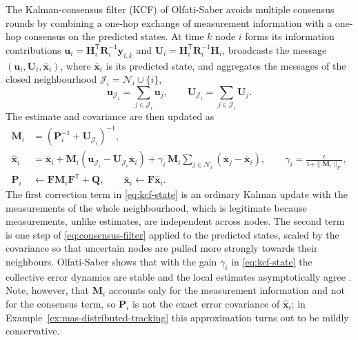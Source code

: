 The Kalman-consensus filter (KCF) of Olfati-Saber \cite{olfatisaber2007_dkf} avoids multiple consensus rounds by combining a one-hop exchange of measurement information with a one-hop consensus on the predicted states. At time $k$ node $i$ forms its information contributions $\mathbf{u}_i=\mathbf{H}_i^{\mathsf T}\mathbf{R}_i^{-1}\mathbf{y}_{i,k}$ and $\mathbf{U}_i=\mathbf{H}_i^{\mathsf T}\mathbf{R}_i^{-1}\mathbf{H}_i$, broadcasts the message $(\mathbf{u}_i,\mathbf{U}_i,\bar{\mathbf{x}}_i)$, where $\bar{\mathbf{x}}_i$ is its predicted state, and aggregates the messages of the closed neighbourhood $\mathcal{J}_i=\mathcal{N}_i\cup\{i\}$,
\begin{equation}
\mathbf{u}_{\mathcal{J}_i}=\sum_{j\in\mathcal{J}_i}\mathbf{u}_j,\qquad
\mathbf{U}_{\mathcal{J}_i}=\sum_{j\in\mathcal{J}_i}\mathbf{U}_j .
\label{eq:kcf-aggregate}
\end{equation}
The estimate and covariance are then updated as
\begin{align}
\mathbf{M}_i&=\left(\mathbf{P}_i^{-1}+\mathbf{U}_{\mathcal{J}_i}\right)^{-1},\label{eq:kcf-cov}\\
\widehat{\mathbf{x}}_i&=\bar{\mathbf{x}}_i+\mathbf{M}_i\left(\mathbf{u}_{\mathcal{J}_i}-\mathbf{U}_{\mathcal{J}_i}\bar{\mathbf{x}}_i\right)+\gamma_i\,\mathbf{M}_i\sum_{j\in\mathcal{N}_i}\left(\bar{\mathbf{x}}_j-\bar{\mathbf{x}}_i\right),\qquad \gamma_i=\frac{\epsilon}{1+\|\mathbf{M}_i\|_{F}},\label{eq:kcf-state}\\
\mathbf{P}_i&\leftarrow\mathbf{F}\mathbf{M}_i\mathbf{F}^{\mathsf T}+\mathbf{Q},\qquad \bar{\mathbf{x}}_i\leftarrow\mathbf{F}\widehat{\mathbf{x}}_i .\label{eq:kcf-predict}
\end{align}
The first correction term in \eqref{eq:kcf-state} is an ordinary Kalman update with the measurements of the whole neighbourhood, which is legitimate because measurements, unlike estimates, are independent across nodes. The second term is one step of \eqref{eq:consensus-filter} applied to the predicted states, scaled by the covariance so that uncertain nodes are pulled more strongly towards their neighbours. Olfati-Saber shows that with the gain $\gamma_i$ in \eqref{eq:kcf-state} the collective error dynamics are stable and the local estimates asymptotically agree \cite{olfatisaber2007_dkf}. Note, however, that $\mathbf{M}_i$ accounts only for the measurement information and not for the consensus term, so $\mathbf{P}_i$ is not the exact error covariance of $\widehat{\mathbf{x}}_i$; in Example~\ref{ex:mas-distributed-tracking} this approximation turns out to be mildly conservative.


